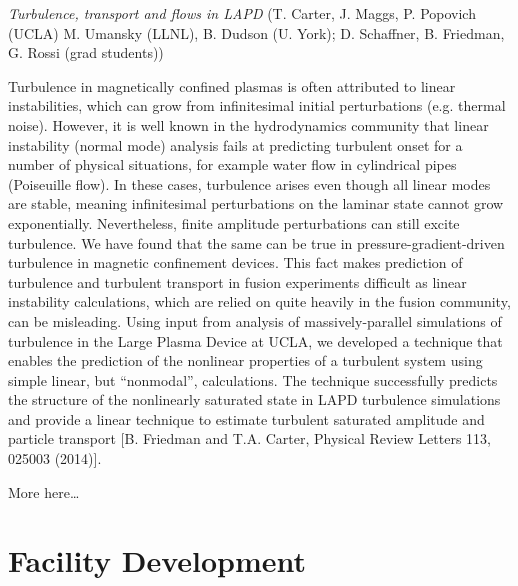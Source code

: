 \documentclass[11pt]{article}
\begin{document}
\emph{Turbulence, transport and flows in LAPD} (T. Carter, J. Maggs, P.
Popovich (UCLA) M. Umansky (LLNL), B. Dudson (U. York); D. Schaffner, B.
Friedman, G. Rossi (grad students))

Turbulence in magnetically confined plasmas is often attributed to
linear instabilities, which can grow from infinitesimal initial
perturbations (e.g. thermal noise). However, it is well known in the
hydrodynamics community that linear instability (normal mode) analysis
fails at predicting turbulent onset for a number of physical situations,
for example water flow in cylindrical pipes (Poiseuille flow). In these
cases, turbulence arises even though all linear modes are stable,
meaning infinitesimal perturbations on the laminar state cannot grow
exponentially. Nevertheless, finite amplitude perturbations can still
excite turbulence. We have found that the same can be true in
pressure-gradient-driven turbulence in magnetic confinement devices.
This fact makes prediction of turbulence and turbulent transport in
fusion experiments difficult as linear instability calculations, which
are relied on quite heavily in the fusion community, can be misleading.
Using input from analysis of massively-parallel simulations of
turbulence in the Large Plasma Device at UCLA, we developed a technique
that enables the prediction of the nonlinear properties of a turbulent
system using simple linear, but ``nonmodal'', calculations. The
technique successfully predicts the structure of the nonlinearly
saturated state in LAPD turbulence simulations and provide a linear
technique to estimate turbulent saturated amplitude and particle
transport {[}B. Friedman and T.A. Carter, Physical Review Letters 113,
025003 (2014){]}.

More here\ldots{}


\section{Facility Development}
\end{document}
